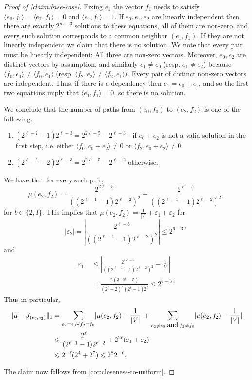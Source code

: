 \documentclass[10pt,a4paper]{article}
\newcommand{\prettyref}[1]{\cref{#1}}
\theoremstyle{definition}
\theoremstyle{remark}
\newcommand{\abs}[1]{\lvert#1\rvert}
\newcommand{\Abs}[1]{\left\lvert#1\right\rvert}
\newcommand{\set}[1]{\{#1\}}
\newcommand{\norm}[1]{\lVert#1\rVert}
\newcommand{\iprod}[1]{\langle#1\rangle}
\newcommand{\ve}{\;\hbox{and}\;}
\renewcommand{\leq}{\leqslant}
\numberwithin{equation}{section}
\let\pref=\prettyref
\begin{document}
\begin{proof}[Proof of \pref{claim:base-case}]
    Fixing \(e_1\) the vector \(f_1\) needs to satisfy \(\iprod{e_0,f_1}=\iprod{e_2,f_1}=0\) and \(\iprod{e_1,f_1} = 1\). If \(e_0,e_1,e_2\) are linearly independent then there are exactly \(2^{m-3}\) solutions to these equations, all of them are non-zero, and every such solution corresponds to a common neighbor \((e_1,f_1)\). If they are not linearly independent we claim that there is no solution. We note that every pair must be linearly independent: All three are non-zero vectors. Moreover, \(e_0,e_2\) are distinct vectors by assumption, and similarly \(e_1 \ne e_0\) (resp. \(e_1 \ne e_2\)) because \(\iprod{f_0,e_0} \ne \iprod{f_0,e_1}\) (resp. \(\iprod{f_2,e_2} \ne \iprod{f_2,e_1}\)). Every pair of distinct non-zero vectors are independent. Thus, if there is a dependency then \(e_1 = e_0+e_2\), and so the first two equations imply that \(\iprod{e_1,f_1} = 0\), so there is no solution. 
    
    We conclude that the number of paths from \((e_0,f_0)\) to \((e_2,f_2)\) is one of the following.
    \begin{enumerate}
        \item \((2^{\ell-2}-1)2^{\ell-3}=2^{2\ell-5}-2^{\ell-3}\) - if \(e_0 + e_2\) is not a valid solution in the first step, i.e. either \(\iprod{f_0,e_0+e_2} \ne 0\) or \(\iprod{f_2,e_0+e_2} \ne 0\).
        \item \((2^{\ell-2}-2)2^{\ell-3} = 2^{2\ell-5}-2^{\ell-2}\) otherwise.
    \end{enumerate}
    We have that for every such pair,
    \[\mu(e_2,f_2) = \frac{2^{2\ell-5}}{((2^{\ell-1}-1)2^{\ell-2})^2} - \frac{2^{\ell-b}}{((2^{\ell-1}-1)2^{\ell-2})^2},\]
    for \(b\in \set{2,3}\).
    This implies that \(\mu(e_2,f_2) = \frac{1}{|V|} + \varepsilon_1 + \varepsilon_2\) for
    \[\abs{\varepsilon_2} = \Abs{\frac{2^{\ell-b}}{((2^{\ell-1}-1)2^{\ell-2})^2}} \leq 2^{6-3\ell}\]
    and 
    \begin{align*}
        \abs{\varepsilon_1} &\leq  \Abs{\frac{2^{2\ell-4}}{((2^{\ell-1}-1)2^{\ell-2})^2} - \frac{1}{|V|}} \\
        &= \frac{2(3 \cdot 2^\ell - 5)}{(2^\ell-2)^2(2^\ell-1)2^\ell} \leq 2^{6-3\ell}
    \end{align*} 
    Thus in particular,
    \begin{align*}
        \norm{\mu - J_{(e_0,e_2)}}_1 &= \sum_{e_2 = e_0 \vee f_2=f_0} \abs{\mu(e_2,f_2) - \frac{1}{|V|}} + \sum_{e_2 \ne e_0 \ve f_2 \ne f_0} \abs{\mu(e_2,f_2) - \frac{1}{|V|}}\\
        &\leq \frac{2^\ell}{(2^{\ell-1}-1)2^{\ell-2}} + 2^{2\ell}(\varepsilon_1 + \varepsilon_2) \\
        &\leq 2^{-\ell} (2^4+2^7) \leq 2^8 2^{-\ell}.
    \end{align*}

    The claim now follows from \pref{cor:closeness-to-uniform}.
\end{proof}
\end{document}
